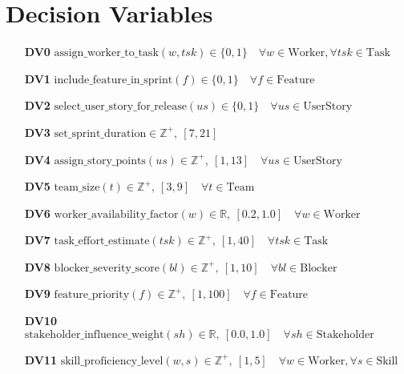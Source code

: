 \documentclass[11pt]{article}
\begin{document}
\section{Decision Variables}
\begin{itemize}
    \item[\textbf{DV0}] $\text{assign\_worker\_to\_task}(w, tsk) \in \{0, 1\} \quad \forall w \in \text{Worker}, \forall tsk \in \text{Task}$
    \item[\textbf{DV1}] $\text{include\_feature\_in\_sprint}(f) \in \{0, 1\} \quad \forall f \in \text{Feature}$
    \item[\textbf{DV2}] $\text{select\_user\_story\_for\_release}(us) \in \{0, 1\} \quad \forall us \in \text{UserStory}$
    \item[\textbf{DV3}] $\text{set\_sprint\_duration} \in \mathbb{Z}^+,\ [7, 21]$
    \item[\textbf{DV4}] $\text{assign\_story\_points}(us) \in \mathbb{Z}^+,\ [1, 13] \quad \forall us \in \text{UserStory}$
    \item[\textbf{DV5}] $\text{team\_size}(t) \in \mathbb{Z}^+,\ [3, 9] \quad \forall t \in \text{Team}$
    \item[\textbf{DV6}] $\text{worker\_availability\_factor}(w) \in \mathbb{R},\ [0.2, 1.0] \quad \forall w \in \text{Worker}$
    \item[\textbf{DV7}] $\text{task\_effort\_estimate}(tsk) \in \mathbb{Z}^+,\ [1, 40] \quad \forall tsk \in \text{Task}$
    \item[\textbf{DV8}] $\text{blocker\_severity\_score}(bl) \in \mathbb{Z}^+,\ [1, 10] \quad \forall bl \in \text{Blocker}$
    \item[\textbf{DV9}] $\text{feature\_priority}(f) \in \mathbb{Z}^+,\ [1, 100] \quad \forall f \in \text{Feature}$
    \item[\textbf{DV10}] $\text{stakeholder\_influence\_weight}(sh) \in \mathbb{R},\ [0.0, 1.0] \quad \forall sh \in \text{Stakeholder}$
    \item[\textbf{DV11}] $\text{skill\_proficiency\_level}(w, s) \in \mathbb{Z}^+,\ [1, 5] \quad \forall w \in \text{Worker}, \forall s \in \text{Skill}$
\end{itemize}
\end{document}
